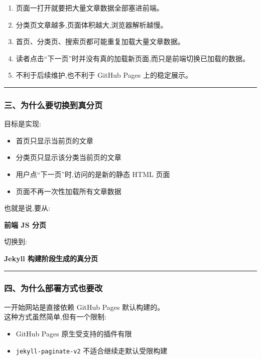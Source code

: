 \documentclass[lang=cn,scheme=chinese,color=blue,device=normal,toc=onecol,math=cm]{elegantbook}
\begin{document}
\begin{enumerate}
\item 页面一打开就要把大量文章数据全部塞进前端。
\item 分类页文章越多,页面体积越大,浏览器解析越慢。
\item 首页、分类页、搜索页都可能重复加载大量文章数据。
\item 读者点击“下一页”时并没有真的加载新页面,而只是前端切换已加载的数据。
\item 不利于后续维护,也不利于 GitHub Pages 上的稳定展示。
\end{enumerate}


\medskip\hrule\medskip


\subsubsection{三、为什么要切换到真分页}


目标是实现:\par


\begin{itemize}
\item 首页只显示当前页的文章
\item 分类页只显示该分类当前页的文章
\item 用户点“下一页”时,访问的是新的静态 HTML 页面
\item 页面不再一次性加载所有文章数据
\end{itemize}


也就是说,要从:\par


\textbf{前端 JS 分页}\par


切换到:\par


\textbf{Jekyll 构建阶段生成的真分页}\par


\medskip\hrule\medskip


\subsubsection{四、为什么部署方式也要改}


一开始网站是直接依赖 GitHub Pages 默认构建的。\\ 这种方式虽然简单,但有一个限制:\par


\begin{itemize}
\item GitHub Pages 原生受支持的插件有限
\item \texttt{jekyll-paginate-v2} 不适合继续走默认受限构建
\end{itemize}
\end{document}
